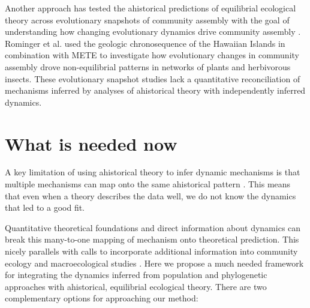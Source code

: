 \documentclass[12pt]{article}
\begin{document}
Another approach has tested the ahistorical predictions of equilibrial
ecological theory across evolutionary snapshots of community assembly
with the goal of understanding how changing evolutionary dynamics
drive community assembly \citep{Olszewski2004-ud,
  Wagner2006-te}. Rominger et
al. \citep{Rominger2015-kb} used the geologic chronosequence of the
Hawaiian Islands in combination with METE to investigate how
evolutionary changes in community assembly drove non-equilibrial
patterns in networks of plants and herbivorous insects.  These evolutionary snapshot studies lack a
quantitative reconciliation of mechanisms inferred by analyses of
ahistorical theory with independently inferred dynamics. 

\section{What is needed now}

A key limitation of using ahistorical theory to infer dynamic
mechanisms is that multiple mechanisms can map onto the same ahistorical pattern \citep{Kendall1948-pj, Kendall1948-ri,
  Engen1996-jt, Engen1996-na, McGill2003-sf}.  This means that even
when a theory describes the data well, we do not know the
dynamics that led to a good fit. 
% 
% 

Quantitative theoretical foundations and direct information about
dynamics can break this many-to-one mapping of mechanism onto
theoretical prediction. This nicely parallels with calls to incorporate
additional information into community ecology and macroecological
studies \citep{McGill2007-zd}. Here we propose a much needed framework for
% 
% 
% 
% 
integrating the dynamics inferred from population and phylogenetic
approaches with ahistorical, equilibrial ecological theory. There are
two complementary options for approaching our method:
\end{document}
